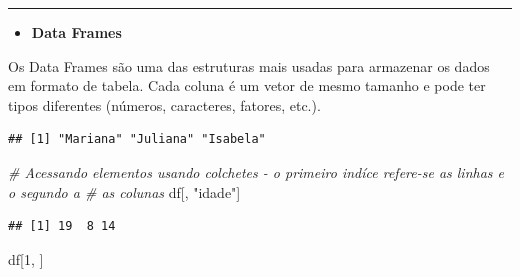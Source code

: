 \documentclass[
]{book}
\newenvironment{Shaded}{\begin{snugshade}}{\end{snugshade}}
\newcommand{\AttributeTok}[1]{\textcolor[rgb]{0.13,0.29,0.53}{#1}}
\newcommand{\CommentTok}[1]{\textcolor[rgb]{0.56,0.35,0.01}{\textit{#1}}}
\newcommand{\DecValTok}[1]{\textcolor[rgb]{0.00,0.00,0.81}{#1}}
\newcommand{\FloatTok}[1]{\textcolor[rgb]{0.00,0.00,0.81}{#1}}
\newcommand{\FunctionTok}[1]{\textcolor[rgb]{0.13,0.29,0.53}{\textbf{#1}}}
\newcommand{\NormalTok}[1]{#1}
\newcommand{\OtherTok}[1]{\textcolor[rgb]{0.56,0.35,0.01}{#1}}
\newcommand{\SpecialCharTok}[1]{\textcolor[rgb]{0.81,0.36,0.00}{\textbf{#1}}}
\newcommand{\StringTok}[1]{\textcolor[rgb]{0.31,0.60,0.02}{#1}}
\providecommand{\tightlist}{%
  \setlength{\itemsep}{0pt}\setlength{\parskip}{0pt}}
\begin{document}
\begin{center}\rule{0.5\linewidth}{0.5pt}\end{center}

\begin{itemize}
\tightlist
\item
  \textbf{Data Frames}
\end{itemize}

Os Data Frames são uma das estruturas mais usadas para armazenar os dados em formato de tabela.
Cada coluna é um vetor de mesmo tamanho e pode ter tipos diferentes (números, caracteres, fatores, etc.).

\begin{Shaded}
\end{Shaded}

\begin{verbatim}
## [1] "Mariana" "Juliana" "Isabela"
\end{verbatim}

\begin{Shaded}
\begin{Highlighting}[]
\CommentTok{\# Acessando elementos usando colchetes {-} o primeiro indíce refere{-}se as linhas e o segundo a \# as colunas}
\NormalTok{df[, }\StringTok{"idade"}\NormalTok{]  }
\end{Highlighting}
\end{Shaded}

\begin{verbatim}
## [1] 19  8 14
\end{verbatim}

\begin{Shaded}
\begin{Highlighting}[]
\NormalTok{df[}\DecValTok{1}\NormalTok{, ]        }
\end{Highlighting}
\end{Shaded}
\end{document}
